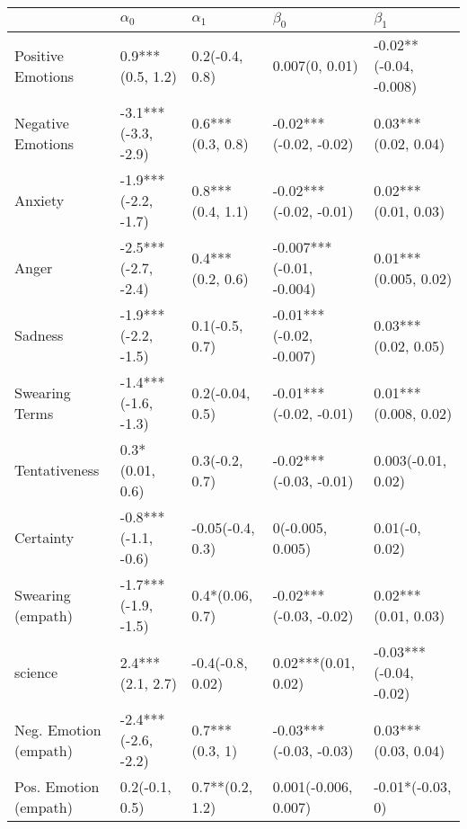 \begin{tabular}{lllll}
\toprule
{} &           $\alpha_0$ &        $\alpha_1$ &                 $\beta_0$ &               $\beta_1$ \\
\midrule
Positive Emotions     &     0.9***(0.5, 1.2) &    0.2(-0.4, 0.8) &            0.007(0, 0.01) &  -0.02**(-0.04, -0.008) \\
Negative Emotions     &  -3.1***(-3.3, -2.9) &  0.6***(0.3, 0.8) &    -0.02***(-0.02, -0.02) &     0.03***(0.02, 0.04) \\
Anxiety               &  -1.9***(-2.2, -1.7) &  0.8***(0.4, 1.1) &    -0.02***(-0.02, -0.01) &     0.02***(0.01, 0.03) \\
Anger                 &  -2.5***(-2.7, -2.4) &  0.4***(0.2, 0.6) &  -0.007***(-0.01, -0.004) &    0.01***(0.005, 0.02) \\
Sadness               &  -1.9***(-2.2, -1.5) &    0.1(-0.5, 0.7) &   -0.01***(-0.02, -0.007) &     0.03***(0.02, 0.05) \\
Swearing Terms        &  -1.4***(-1.6, -1.3) &   0.2(-0.04, 0.5) &    -0.01***(-0.02, -0.01) &    0.01***(0.008, 0.02) \\
Tentativeness         &      0.3*(0.01, 0.6) &    0.3(-0.2, 0.7) &    -0.02***(-0.03, -0.01) &      0.003(-0.01, 0.02) \\
Certainty             &  -0.8***(-1.1, -0.6) &  -0.05(-0.4, 0.3) &          0(-0.005, 0.005) &          0.01(-0, 0.02) \\
Swearing (empath)     &  -1.7***(-1.9, -1.5) &   0.4*(0.06, 0.7) &    -0.02***(-0.03, -0.02) &     0.02***(0.01, 0.03) \\
science               &     2.4***(2.1, 2.7) &  -0.4(-0.8, 0.02) &       0.02***(0.01, 0.02) &  -0.03***(-0.04, -0.02) \\
Neg. Emotion (empath) &  -2.4***(-2.6, -2.2) &    0.7***(0.3, 1) &    -0.03***(-0.03, -0.03) &     0.03***(0.03, 0.04) \\
Pos. Emotion (empath) &       0.2(-0.1, 0.5) &   0.7**(0.2, 1.2) &      0.001(-0.006, 0.007) &        -0.01*(-0.03, 0) \\
\bottomrule
\end{tabular}
